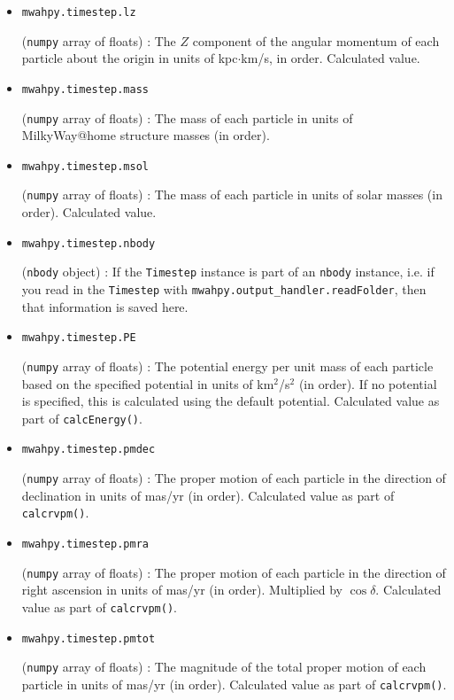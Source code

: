 \documentclass{article}
\begin{document}
\begin{itemize}
\item \verb!mwahpy.timestep.lz!

(\verb!numpy! array of floats) : The $Z$ component of the angular momentum of each particle about the origin in units of kpc$\cdot$km/s, in order. Calculated value.

\item \verb!mwahpy.timestep.mass!

(\verb!numpy! array of floats) : The mass of each particle in units of MilkyWay@home structure masses (in order). 

\item \verb!mwahpy.timestep.msol!

(\verb!numpy! array of floats) : The mass of each particle in units of solar masses (in order). Calculated value.

\item \verb!mwahpy.timestep.nbody!

(\verb!nbody! object) : If the \verb!Timestep! instance is part of an \verb!nbody! instance, i.e. if you read in the \verb!Timestep! with \verb!mwahpy.output_handler.readFolder!, then that information is saved here. 

\item \verb!mwahpy.timestep.PE!

(\verb!numpy! array of floats) : The potential energy per unit mass of each particle based on the specified potential in units of km$^2$/s$^2$ (in order). If no potential is specified, this is calculated using the default \mwahpy potential. Calculated value as part of \verb!calcEnergy()!.

\item \verb!mwahpy.timestep.pmdec!

(\verb!numpy! array of floats) : The proper motion of each particle in the direction of declination in units of mas/yr (in order). Calculated value as part of \verb!calcrvpm()!.

\item \verb!mwahpy.timestep.pmra!

(\verb!numpy! array of floats) : The proper motion of each particle in the direction of right ascension in units of mas/yr (in order). Multiplied by $\cos\delta.$ Calculated value as part of \verb!calcrvpm()!.

\item \verb!mwahpy.timestep.pmtot!

(\verb!numpy! array of floats) : The magnitude of the total proper motion of each particle in units of mas/yr (in order). Calculated value as part of \verb!calcrvpm()!.


\end{itemize}
\end{document}
